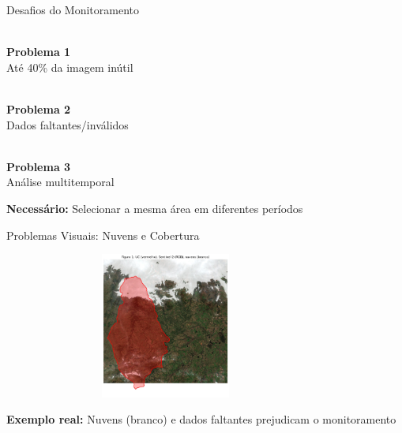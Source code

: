 \documentclass[aspectratio=169,11pt]{beamer}
\begin{document}
\begin{frame}{Desafios do Monitoramento}
\vspace{-0.2cm}
\begin{multicols}{3}
    \begin{center}
        \\
        \textbf{Problema 1}\\
        {\footnotesize Até 40\% da imagem inútil}
    \end{center}
    
    \columnbreak%
    \begin{center}
        \\
        \textbf{Problema 2}\\
        {\footnotesize Dados faltantes/inválidos}
    \end{center}
    
    \columnbreak%
    \begin{center}
        \\
        \textbf{Problema 3}\\
        {\footnotesize Análise multitemporal}
    \end{center}
\end{multicols}

\vspace{0.3cm}
\begin{center}
    \colorbox{accent!10}{\parbox{8cm}{\centering\textbf{Necessário:} Selecionar a mesma área em diferentes períodos}}
\end{center}
\end{frame}

\begin{frame}{Problemas Visuais: Nuvens e Cobertura}
\begin{center}
    \includegraphics[width=0.8\textwidth,height=4.8cm,keepaspectratio]{img/visualizacao_clouds_and_outfovcorner.jpg}
\end{center}
\vspace{-0.2cm}
\begin{center}
    \footnotesize\textbf{Exemplo real:} Nuvens (branco) e dados faltantes prejudicam o monitoramento
\end{center}
\end{frame}
\end{document}
